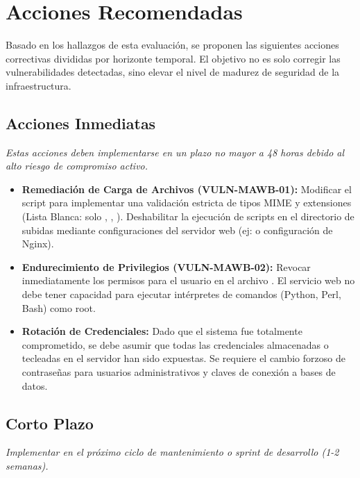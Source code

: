 \documentclass[a4paper]{article}
\newcommand{\maquinaID}{MAWB} %
\begin{document}
\section{Acciones Recomendadas}
\label{sec:acciones}

Basado en los hallazgos de esta evaluación, se proponen las siguientes acciones correctivas divididas por horizonte temporal. El objetivo no es solo corregir las vulnerabilidades detectadas, sino elevar el nivel de madurez de seguridad de la infraestructura.

\subsection{Acciones Inmediatas}
\textit{Estas acciones deben implementarse en un plazo no mayor a 48 horas debido al alto riesgo de compromiso activo.}

\begin{itemize}
    \item \textbf{Remediación de Carga de Archivos (VULN-\maquinaID-01):} 
    Modificar el script  para implementar una validación estricta de tipos MIME y extensiones (Lista Blanca: solo , , ). Deshabilitar la ejecución de scripts en el directorio de subidas mediante configuraciones del servidor web (ej:  o configuración de Nginx).
    
    \item \textbf{Endurecimiento de Privilegios (VULN-\maquinaID-02):} 
    Revocar inmediatamente los permisos  para el usuario  en el archivo . El servicio web no debe tener capacidad para ejecutar intérpretes de comandos (Python, Perl, Bash) como root.
    
    \item \textbf{Rotación de Credenciales:} 
    Dado que el sistema fue totalmente comprometido, se debe asumir que todas las credenciales almacenadas o tecleadas en el servidor han sido expuestas. Se requiere el cambio forzoso de contraseñas para usuarios administrativos y claves de conexión a bases de datos.
\end{itemize}

\subsection{Corto Plazo}
\textit{Implementar en el próximo ciclo de mantenimiento o sprint de desarrollo (1-2 semanas).}
\end{document}
